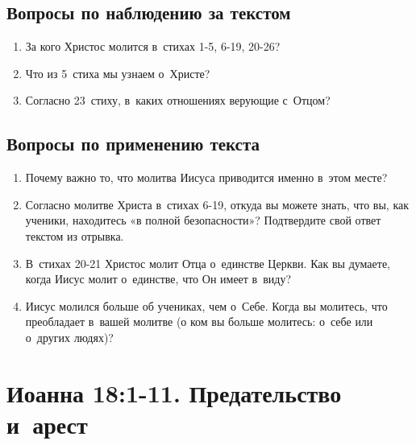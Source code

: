 \documentclass[a4paper,12pt]{article}
\begin{document}
\subsection*{Вопросы по наблюдению за текстом}
\begin{enumerate}
    \item За кого Христос молится в~стихах 1-5, 6-19, 20-26? 
    
    \myline
    
    \myline
    \item Что из 5~стиха мы узнаем о~Христе? 
    
    \myline
    
    \myline
    \item Согласно 23~стиху, в~каких отношениях верующие с~Отцом? 
    
    \myline
    
    \myline
\end{enumerate}

\subsection*{Вопросы по применению текста} 
\begin{enumerate}
    \item Почему важно то, что молитва Иисуса приводится именно в~этом месте? 
    
    \myline
    
    \myline
    \item Согласно молитве Христа в~стихах 6-19, откуда вы можете знать, что вы, как ученики, находитесь «в полной безопасности»? Подтвердите свой ответ текстом из отрывка.
    
    \myline
    
    \myline
    \item В~стихах 20-21 Христос молит Отца о~единстве Церкви. Как вы думаете, когда Иисус молит о~единстве, что Он имеет в~виду? 
    
    \myline
    
    \myline
    \item Иисус молился больше об учениках, чем о~Себе. Когда вы молитесь, что преобладает в~вашей молитве (о ком вы больше молитесь: о~себе или о~других людях)? 
    
    \myline
    
    \myline
\end{enumerate}



\section{Иоанна 18:1-11. Предательство и~арест}
\end{document}
